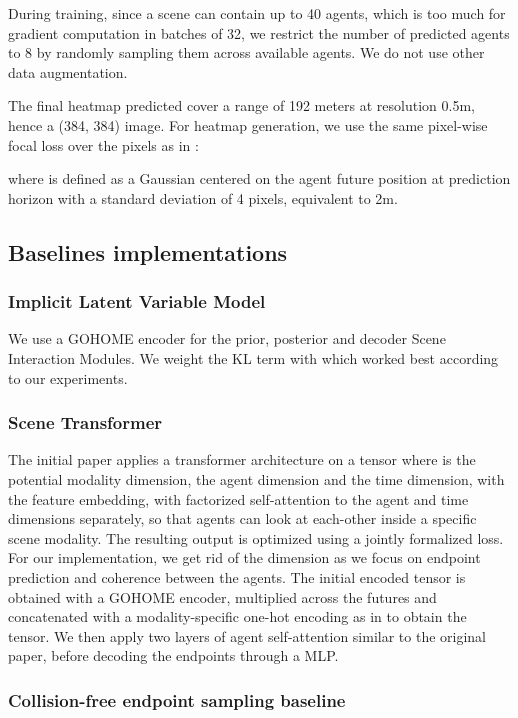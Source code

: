 \documentclass{article} \usepackage{iclr2022_conference,times}
\begin{document}
During training, since a scene can contain up to 40 agents, which is too much for gradient computation in batches of 32, we restrict the number of predicted agents to 8 by randomly sampling them across available agents. We do not use other data augmentation.

The final heatmap  predicted cover a range of 192 meters at resolution 0.5m, hence a (384, 384) image.
For heatmap generation, we use the same pixel-wise focal loss over the pixels  as in \citet{gilles2021home}:

where  is defined as a Gaussian centered on the agent future position at prediction horizon  with a standard deviation of 4 pixels, equivalent to 2m.

\subsection{Baselines implementations}
\label{sec:baselines}

\subsubsection{Implicit Latent Variable Model}

We use a GOHOME encoder for the prior, posterior and decoder Scene Interaction Modules. We weight the KL term with  which worked best according to our experiments.

\subsubsection{Scene Transformer}

The initial paper applies a transformer architecture on a  tensor where  is the potential modality dimension,  the agent dimension and  the time dimension, with  the feature embedding, with factorized self-attention to the agent and time dimensions separately, so that agents can look at each-other inside a specific scene modality. The resulting output is optimized using a jointly formalized loss. For our implementation, we get rid of the  dimension as we focus on endpoint prediction and coherence between the  agents. The initial encoded  tensor is obtained with a GOHOME encoder, multiplied across the  futures and concatenated with a modality-specific one-hot encoding as in \citet{ngiam2021scene} to obtain the  tensor. We then apply two layers of agent self-attention similar to the original paper, before decoding the endpoints through a MLP.

\subsubsection{Collision-free endpoint sampling baseline}
\label{sec:col_sample}
\end{document}

